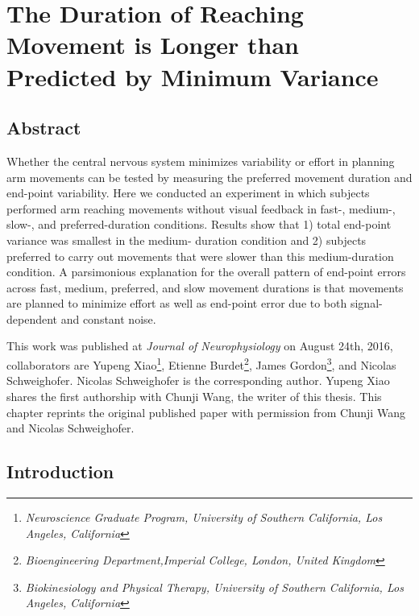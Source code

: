 \chapter{The Duration of Reaching Movement is Longer than Predicted by Minimum Variance}
\label{cha:md}

\section{Abstract}
Whether the central nervous system minimizes variability or effort in planning arm movements can be tested by measuring the preferred movement duration and end-point variability. Here we conducted an experiment in which subjects performed arm reaching movements without visual feedback in fast-, medium-, slow-, and preferred-duration conditions. Results show that 1) total end-point variance was smallest in the medium- duration condition and 2) subjects preferred to carry out movements that were slower than this medium-duration condition. A parsimonious explanation for the overall pattern of end-point errors across fast, medium, preferred, and slow movement durations is that movements are planned to minimize effort as well as end-point error due to both signal-dependent and constant noise.

This work was published at \textit{Journal of Neurophysiology} on August 24th, 2016, collaborators are Yupeng Xiao\footnote{\textit{Neuroscience Graduate Program, University of Southern California, Los Angeles, California}}, Etienne Burdet\footnote{\textit{Bioengineering Department,Imperial College, London, United Kingdom}}, James Gordon\footnote{\label{bknpt}\textit{Biokinesiology and Physical Therapy, University of Southern California, Los Angeles, California}}, and Nicolas Schweighofer\footnotemark[\ref{bknpt}]. Nicolas Schweighofer is the corresponding author. Yupeng Xiao shares the first authorship with Chunji Wang, the writer of this thesis. This chapter reprints the original published paper with permission from Chunji Wang and Nicolas Schweighofer.

\section{Introduction}

